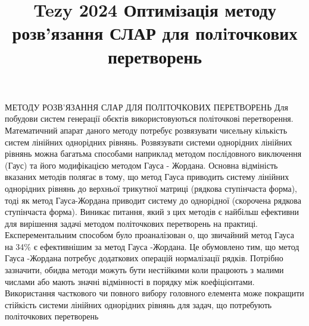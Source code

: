 \documentclass[12pt,a4paper]{article}
\begin{document}
\title{Tezy 2024 Оптимізація методу розв'язання СЛАР для полiточкових перетворень}
\maketitle
МЕТОДУ РОЗВ'ЯЗАННЯ СЛАР ДЛЯ ПОЛIТОЧКОВИХ ПЕРЕТВОРЕНЬ Для побудови систем генерації обєктів використовуються політочкові перетворення. Математичний апарат даного методу потребує розвязувати чисельну кількість систем лінійних однорідних рівнянь. Розвязувати системи однорідних лінійних рівнянь можна багатьма способами наприклад методом послідовного виключення (Гаус) та його модифікацією методом Гауса - Жордана. Основна відміність вказаних методів полягає в тому, що метод Гауса приводить систему лінійних однорідних рівнянь до верхньої трикутної матриці (рядкова ступінчаста форма), тоді як метод Гауса-Жордана приводит систему до однорідної (скорочена рядкова ступінчаста форма). Виникає питання, який з цих методів є найбільш ефективни для вирішення задачі методом політочкових перетворень на практиці. Експерементальним способом було проаналізован о, що звичайний метод Гауса на 34\% є ефективнішим за метод Гауса -Жордана. Це обумовлено тим, що метод Гауса -Жордана потребує додаткових операцій нормалізації рядків. Потрібно зазначити, обидва методи можуть бути нестійкими коли працюють з малими числами або мають значні відмінності в порядку між коефіцієнтами. Використання часткового чи повного вибору головного елемента може покращити стійкість системи лінійних однорідних рівнянь для задач, що потребують політочкових перетворень
\par
\end{document}
